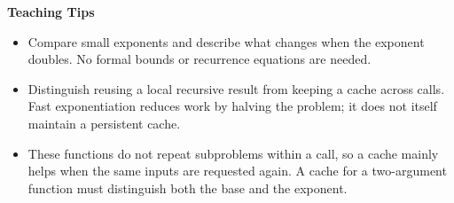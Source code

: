 \begin{parts}

\end{parts}

\begin{guide}
\textbf{Teaching Tips}
\begin{itemize}
    \item Compare small exponents and describe what changes when the exponent
    doubles. No formal bounds or recurrence equations are needed.
    \item Distinguish reusing a local recursive result from keeping a cache
    across calls. Fast exponentiation reduces work by halving the problem;
    it does not itself maintain a persistent cache.
    \item These functions do not repeat subproblems within a call, so a cache
    mainly helps when the same inputs are requested again. A cache for a
    two-argument function must distinguish both the base and the exponent.
\end{itemize}
\end{guide}
